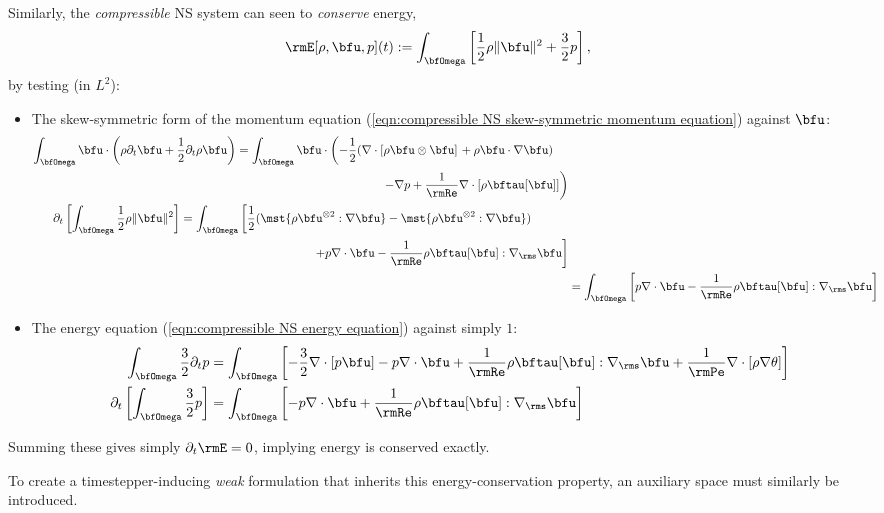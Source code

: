     Similarly, the \emph{compressible} NS system can seen to \emph{conserve} energy,
    \begin{equation}
        \rmE[\rho, \bfu, p](t)  :=  \int_{\bfOmega}\left[\frac{1}{2}\rho\|\bfu\|^{2} + \frac{3}{2}p\right],
    \end{equation}
    by testing (in $L^{2}$):
    \begin{itemize}
        \item  The skew-symmetric form of the momentum equation (\ref{eqn:compressible NS skew-symmetric momentum equation}) against $\bfu$:
        \begin{align}
            \begin{split}
                \int_{\bfOmega}\bfu\cdot\left(\rho\partial_{t}\bfu + \frac{1}{2}\partial_{t}\rho\bfu\right)  &=  \int_{\bfOmega}\bfu\cdot\left(- \frac{1}{2}(\nabla\cdot\left[\rho\bfu\otimes\bfu\right]\right. + \rho\bfu\cdot\nabla\bfu)  \\
                &\;\;\;\;\;\;\;\;\;\;\;\;\;\;\;\;\;\;\;\;\;\;\;\;\;\;\;\;\;\;\;\;\;\;\;\;\;\;\;\;\;\;\;\;\left.- \nabla p + \frac{1}{\rmRe}\nabla\cdot[\rho\bftau[\bfu]]\right)
            \end{split}  \\
            \begin{split}
                \partial_{t}\left[\int_{\bfOmega}\frac{1}{2}\rho\|\bfu\|^{2}\right]  &=  \int_{\bfOmega}\left[\frac{1}{2}(\mst{\rho\bfu^{\otimes 2}:\nabla\bfu} - \mst{\rho\bfu^{\otimes 2}:\nabla\bfu})\right.  \\
                &\;\;\;\;\;\;\;\;\;\;\;\;\;\;\;\;\;\;\;\;\;\;\;\;\;\;\;\;\;\;\;\;\;\;\;\;\;\;\;\;\left.+ p\nabla\cdot\bfu - \frac{1}{\rmRe}\rho\bftau[\bfu]:\nabla_{\rms}\bfu\right]
            \end{split}  \\
            &=  \int_{\bfOmega}\left[p\nabla\cdot\bfu - \frac{1}{\rmRe}\rho\bftau[\bfu]:\nabla_{\rms}\bfu\right]
        \end{align}
        \item  The energy equation (\ref{eqn:compressible NS energy equation}) against simply $1$:
        \begin{align}
            \int_{\bfOmega}\frac{3}{2}\partial_{t}p  &=  \int_{\bfOmega}\left[- \frac{3}{2}\nabla\cdot[p\bfu] - p\nabla\cdot\bfu + \frac{1}{\rmRe}\rho\bftau[\bfu]:\nabla_{\rms}\bfu + \frac{1}{\rmPe}\nabla\cdot[\rho\nabla\theta]\right]  \\
            \partial_{t}\left[\int_{\bfOmega}\frac{3}{2}p\right]  &=  \int_{\bfOmega}\left[- p\nabla\cdot\bfu + \frac{1}{\rmRe}\rho\bftau[\bfu]:\nabla_{\rms}\bfu\right]
        \end{align}
    \end{itemize}
    Summing these gives simply $\partial_{t}\rmE  =  0$, implying energy is conserved exactly.

    To create a timestepper-inducing \emph{weak} formulation that inherits this energy-conservation property, an auxiliary space must similarly be introduced. 
    